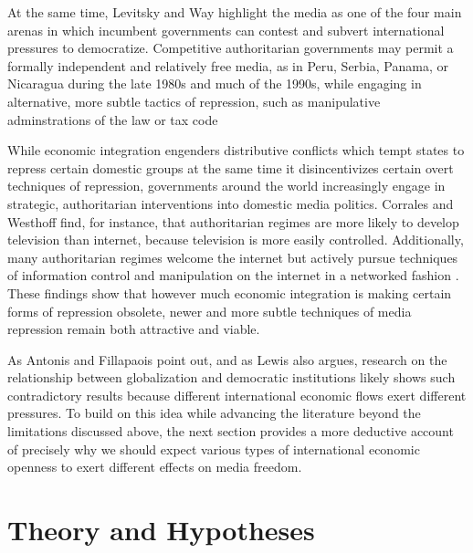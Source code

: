 \documentclass[12pt,a4paper]{article}\usepackage[]{graphicx}\usepackage[]{color}
\begin{document}
At the same time, Levitsky and Way highlight the media as one of the four main arenas in which incumbent governments can contest and subvert international pressures to democratize. Competitive authoritarian governments may permit a formally independent and relatively free media, as in Peru, Serbia, Panama, or Nicaragua during the late 1980s and much of the 1990s, while engaging in alternative, more subtle tactics of repression, such as manipulative adminstrations of the law or tax code \parencite[53, 58]{Levitsky:2002gx}

While economic integration engenders distributive conflicts which tempt states to repress certain domestic groups at the same time it disincentivizes certain overt techniques of repression, governments around the world increasingly engage in strategic, authoritarian interventions into domestic media politics. Corrales and Westhoff \parencite*{Corrales:2006vz} find, for instance, that authoritarian regimes are more likely to develop television than internet, because television is more easily controlled. Additionally, many authoritarian regimes welcome the internet but actively pursue techniques of information control and manipulation on the internet in a networked fashion \parencites{MacKinnon:2011id}{Pearce:2012fm}. These findings show that however much economic integration is making certain forms of repression obsolete, newer and more subtle techniques of media repression remain both attractive and viable.

As Antonis and Fillapaois point out, and as Lewis also argues, research on the relationship between globalization and democratic institutions likely shows such contradictory results because different international economic flows exert different pressures. To build on this idea while advancing the literature beyond the limitations discussed above, the next section provides a more deductive account of precisely why we should expect various types of international economic openness to exert different effects on media freedom.

\section{Theory and Hypotheses}
\end{document}
